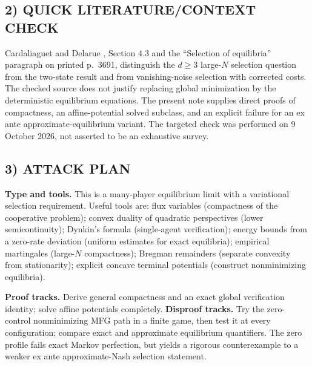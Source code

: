 \documentclass[11pt,a4paper]{article}
\theoremstyle{definition}
\theoremstyle{remark}
\begin{document}
\subsection*{2) QUICK LITERATURE/CONTEXT CHECK}
Cardaliaguet and Delarue \cite{cardaliaguet-delarue}, Section 4.3 and the ``Selection of equilibria'' paragraph on printed p.~3691, distinguish the $d\geq3$ large-$N$ selection question from the two-state result and from vanishing-noise selection with corrected costs. The checked source does not justify replacing global minimization by the deterministic equilibrium equations. The present note supplies direct proofs of compactness, an affine-potential solved subclass, and an explicit failure for an ex ante approximate-equilibrium variant. The targeted check was performed on 9 October 2026, not asserted to be an exhaustive survey.

\subsection*{3) ATTACK PLAN}
\textbf{Type and tools.} This is a many-player equilibrium limit with a variational selection requirement. Useful tools are: flux variables (compactness of the cooperative problem); convex duality of quadratic perspectives (lower semicontinuity); Dynkin's formula (single-agent verification); energy bounds from a zero-rate deviation (uniform estimates for exact equilibria); empirical martingales (large-$N$ compactness); Bregman remainders (separate convexity from stationarity); explicit concave terminal potentials (construct nonminimizing equilibria).

\textbf{Proof tracks.} Derive general compactness and an exact global verification identity; solve affine potentials completely. \textbf{Disproof tracks.} Try the zero-control nonminimizing MFG path in a finite game, then test it at every configuration; compare exact and approximate equilibrium quantifiers. The zero profile fails exact Markov perfection, but yields a rigorous counterexample to a weaker ex ante approximate-Nash selection statement.
\end{document}
